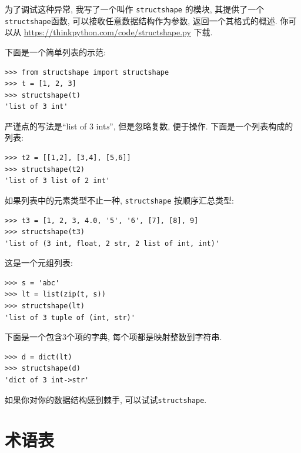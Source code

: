 \documentclass[10pt]{book}
\begin{document}
为了调试这种异常, 我写了一个叫作 {\tt structshape} 的模块, 
其提供了一个{\tt structshape}函数, 可以接收任意数据结构作为参数, 
返回一个其格式的概述. 
你可以从 \url{https://thinkpython.com/code/structshape.py} 下载. 

下面是一个简单列表的示范:

\begin{verbatim}
>>> from structshape import structshape
>>> t = [1, 2, 3]
>>> structshape(t)
'list of 3 int'
\end{verbatim}
%

严谨点的写法是``list of 3 int{\em s}'', 
但是忽略复数, 便于操作. 下面是一个列表构成的列表:

\begin{verbatim}
>>> t2 = [[1,2], [3,4], [5,6]]
>>> structshape(t2)
'list of 3 list of 2 int'
\end{verbatim}
%
如果列表中的元素类型不止一种, 
{\tt structshape} 按顺序汇总类型:

\begin{verbatim}
>>> t3 = [1, 2, 3, 4.0, '5', '6', [7], [8], 9]
>>> structshape(t3)
'list of (3 int, float, 2 str, 2 list of int, int)'
\end{verbatim}
%
这是一个元组列表:

\begin{verbatim}
>>> s = 'abc'
>>> lt = list(zip(t, s))
>>> structshape(lt)
'list of 3 tuple of (int, str)'
\end{verbatim}
%
下面是一个包含3个项的字典, 每个项都是映射整数到字符串.

\begin{verbatim}
>>> d = dict(lt) 
>>> structshape(d)
'dict of 3 int->str'
\end{verbatim}
%
如果你对你的数据结构感到棘手, 可以试试{\tt structshape}.


\section{术语表}
\end{document}
